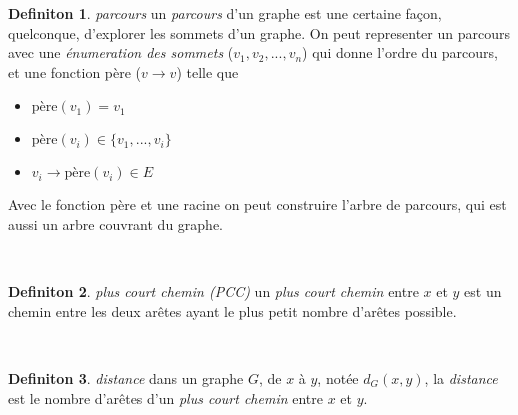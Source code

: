 \documentclass[french]{article}
\theoremstyle{definition}
\newtheorem{definition}{Definiton}[subsection]
\begin{document}
		\begin{definition}{\textit{parcours}}
			un \textit{parcours} d'un graphe est une certaine façon, quelconque, d'explorer les sommets d'un graphe. On peut representer un parcours avec une \textit{énumeration des sommets} ($v_1, v_2, ... , v_n$) qui donne l'ordre du parcours, et une fonction père ($v \to v$) telle que
			\begin{itemize}
				\item $\text{père}(v_1) = v_1$
				\item $\text{père}(v_i) \in \{v_1, ... , v_i\}$
				\item $v_i \to \text{père}(v_i) \in E$
			\end{itemize}

			Avec le fonction père et une racine on peut construire l'arbre de parcours, qui est aussi un arbre couvrant du graphe.
		\end{definition}
		\
		\begin{definition}{\textit{plus court chemin (PCC)}}
			un \textit{plus court chemin} entre $x$ et $y$ est un chemin entre les deux arêtes ayant le plus petit nombre d'arêtes possible.
		\end{definition}
		\
		\begin{definition}{\textit{distance}}
			dans un graphe $G$, de $x$ à $y$, notée $d_G(x, y)$, la \textit{distance} est le nombre d'arêtes d'un \textit{plus court chemin} entre $x$ et $y$.
		\end{definition}
\end{document}
